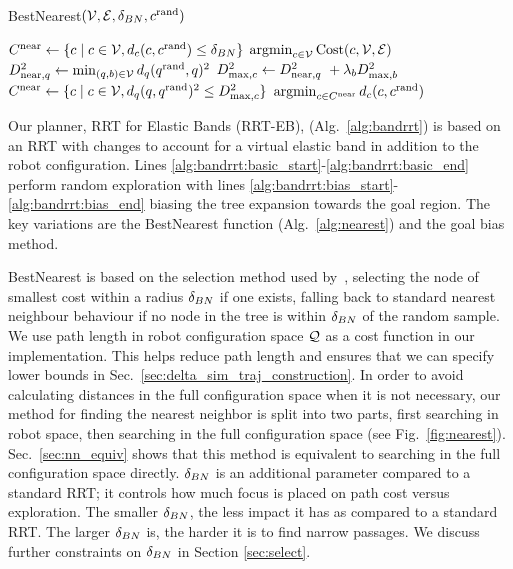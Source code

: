 \begin{algorithm}[t]
\caption{BestNearest$(\mathcal{V}, \mathcal{E}, \delta_{BN}, c^\textrm{rand})$}
\begin{algorithmic}[1]
    \State $C^{\textrm{near}} \gets \{ c \mid c \in \mathcal{V}, d_c(c, c^\textrm{rand}) \leq \delta_{BN} \}$
    \If {$\Pstatenear \neq \emptyset$}
        \State \Return $\operatorname*{argmin}_{c \in \mathcal{V}} \textrm{Cost}(c, \mathcal{V}, \mathcal{E})$
    \Else
        \State $D_{\textrm{near},q}^2 \gets \min_{(q, b) \in \mathcal{V}}{d_q(q^\textrm{rand}, q)^2}$ \label{alg:nearst:robotspace}
        \State $D_{\textrm{max},c}^2 \gets D_{\textrm{near},q}^2\ + \lambda_b D_{\textrm{max},b}^2$
        \State $C^{\textrm{near}} \gets \{ c \mid c \in \mathcal{V}, d_q(q, q^\textrm{rand})^2 \leq D_{\textrm{max},c}^2 \}$ \label{alg:nearest:radius}
        \State \Return $\operatorname*{argmin}_{c \in C^{\textrm{near}}}{d_c(c, c^\textrm{rand})}$ \label{alg:nearest:fullspace}
    \EndIf
\end{algorithmic}
\label{alg:nearest}
\end{algorithm}

Our planner, RRT for Elastic Bands (RRT-EB), (Alg.~\ref{alg:bandrrt}) is based on an RRT with changes to account for a virtual elastic band in addition to the robot configuration. Lines \ref{alg:bandrrt:basic_start}-\ref{alg:bandrrt:basic_end} perform random exploration with lines \ref{alg:bandrrt:bias_start}-\ref{alg:bandrrt:bias_end} biasing the tree expansion towards the goal region. The key variations are the BestNearest function (Alg.~\ref{alg:nearest}) and the goal bias method.

BestNearest is based on the selection method used by~\cite{LiAOKP2016}, selecting the node of smallest cost within a radius $\delta_{BN}$ if one exists, falling back to standard nearest neighbour behaviour if no node in the tree is within $\delta_{BN}$ of the random sample. We use path length in robot configuration space $\mathcal{Q}$ as a cost function in our implementation. This helps reduce path length and ensures that we can specify lower bounds in Sec.~\ref{sec:delta_sim_traj_construction}. In order to avoid calculating distances in the full configuration space when it is not necessary, our method for finding the nearest neighbor is split into two parts, first searching in robot space, then searching in the full configuration space (see Fig.~\ref{fig:nearest}). Sec.~\ref{sec:nn_equiv} shows that this method is equivalent to searching in the full configuration space directly. $\delta_{BN}$ is an additional parameter compared to a standard RRT; it controls how much focus is placed on path cost versus exploration. The smaller $\delta_{BN}$, the less impact it has as compared to a standard RRT.  The larger $\delta_{BN}$ is, the harder it is to find narrow passages. We discuss further constraints on $\delta_{BN}$ in Section \ref{sec:select}.


